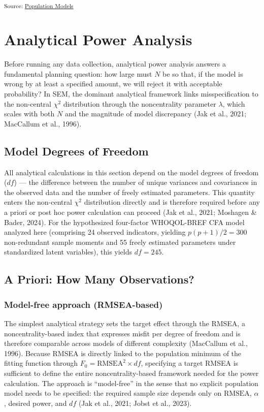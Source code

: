 \documentclass[
  letterpaper,
  DIV=11,
  numbers=noendperiod]{scrartcl}
\begin{document}
\textsubscript{Source:
\href{https://phdpablo.github.io/cfa-power/Scripts/AnalysisScripts/01_population_models-preview.html\#cell-fig-diagram-analyzemodel}{Population
Models}}

\section{Analytical Power Analysis}\label{sec-analytical}

Before running any data collection, analytical power analysis answers a
fundamental planning question: how large must \(N\) be so that, if the
model is wrong by at least a specified amount, we will reject it with
acceptable probability? In SEM, the dominant analytical framework links
misspecification to the non-central \(\chi^2\) distribution through the
noncentrality parameter \(\lambda\), which scales with both \(N\) and
the magnitude of model discrepancy (Jak et al., 2021; MacCallum et al.,
1996).

\subsection{Model Degrees of Freedom}\label{sec-df}

All analytical calculations in this section depend on the model degrees
of freedom (\(df\)) --- the difference between the number of unique
variances and covariances in the observed data and the number of freely
estimated parameters. This quantity enters the non-central \(\chi^2\)
distribution directly and is therefore required before any a priori or
post hoc power calculation can proceed (Jak et al., 2021; Moshagen \&
Bader, 2024). For the hypothesized four-factor WHOQOL-BREF CFA model
analyzed here (comprising 24 observed indicators, yielding
\(p(p + 1)/2 = 300\) non-redundant sample moments and 55 freely
estimated parameters under standardized latent variables), this yields
\(df = 245\).

\subsection{A Priori: How Many Observations?}\label{sec-apriori}

\subsubsection{Model-free approach
(RMSEA-based)}\label{model-free-approach-rmsea-based}

The simplest analytical strategy sets the target effect through the
RMSEA, a noncentrality-based index that expresses misfit per degree of
freedom and is therefore comparable across models of different
complexity (MacCallum et al., 1996). Because RMSEA is directly linked to
the population minimum of the fitting function through
\(F_0 = \text{RMSEA}^2 \times df\), specifying a target RMSEA is
sufficient to define the entire noncentrality-based framework needed for
the power calculation. The approach is ``model-free'' in the sense that
no explicit population model needs to be specified: the required sample
size depends only on \(\text{RMSEA}\), \(\alpha\), desired power, and
\(df\) (Jak et al., 2021; Jobst et al., 2023).
\end{document}
